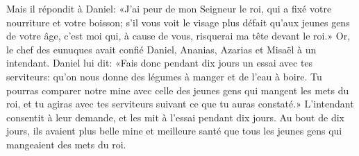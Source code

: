 Mais il répondit à Daniel:
	«J’ai peur de mon Seigneur le roi, qui a fixé votre nourriture et votre boisson;
	s’il vous voit le visage plus défait qu’aux jeunes gens de votre âge,
	c’est moi qui, à cause de vous, risquerai ma tête devant le roi.»
Or, le chef des eunuques avait confié Daniel, Ananias, Azarias et Misaël à un intendant.
Daniel lui dit: «Fais donc pendant dix jours un essai avec tes serviteurs:
	qu’on nous donne des légumes à manger et de l’eau à boire.
Tu pourras comparer notre mine avec celle des jeunes gens qui mangent les mets du roi,
	et tu agiras avec tes serviteurs suivant ce que tu auras constaté.»
L’intendant consentit à leur demande, et les mit à l’essai pendant dix jours.
Au bout de dix jours, ils avaient plus belle mine et meilleure santé
		que tous les jeunes gens qui mangeaient des mets du roi.
